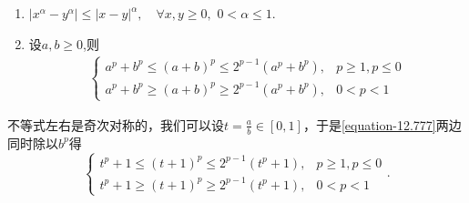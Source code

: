 \documentclass[../../main.tex]{subfiles}%
\begin{document}
\begin{proposition}[经典初等不等式]\label{proposition:经典初等不等式}
\begin{enumerate}[(1)]
\item\label{proposition:经典初等不等式-1} $\left| x^{\alpha}-y^{\alpha} \right|\leqslant \left| x-y \right|^{\alpha},\quad \forall x,y\geqslant 0,\,\,0<\alpha \leqslant 1.$

\item\label{proposition:经典初等不等式-2} 设\(a,b\geqslant0\),则
\begin{align}\label{equation-12.777}
\begin{cases}
a^p + b^p\leqslant(a + b)^p\leqslant2^{p - 1}(a^p + b^p),& p\geqslant1,p\leqslant0\\
a^p + b^p\geqslant(a + b)^p\geqslant2^{p - 1}(a^p + b^p),& 0 < p < 1
\end{cases}
\end{align}
\end{enumerate}
\end{proposition}
\begin{note}
不等式左右是奇次对称的，我们可以设\(t = \frac{a}{b}\in[0,1]\)，于是\eqref{equation-12.777}两边同时除以$b^p$得
\[
\begin{cases}
t^p + 1\leqslant(t + 1)^p\leqslant2^{p - 1}(t^p + 1),& p\geqslant1,p\leqslant0\\
t^p + 1\geqslant(t + 1)^p\geqslant2^{p - 1}(t^p + 1),& 0 < p < 1
\end{cases}.
\]
\end{note}
\end{document}
